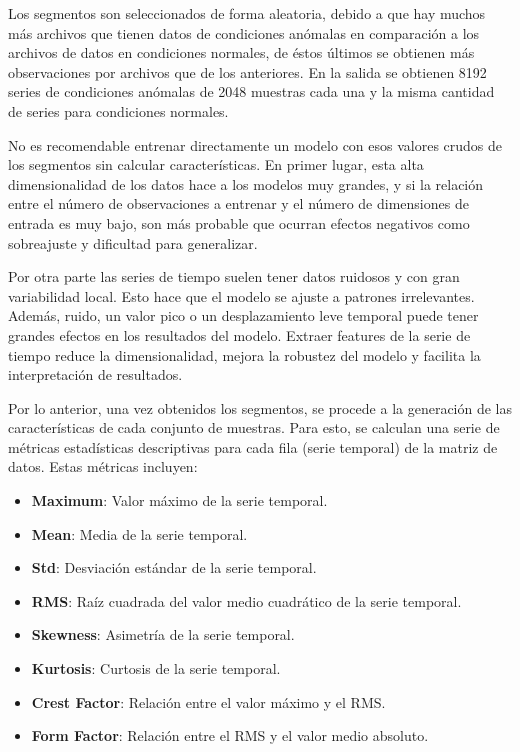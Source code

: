 \documentclass[11pt,a4paper,spanish]{book}
\numberwithin{equation}{chapter}
\numberwithin{figure}{chapter}
\begin{document}
Los segmentos son seleccionados de forma aleatoria, debido a que hay muchos más archivos que tienen datos de condiciones anómalas en comparación a los archivos de datos en condiciones normales, de éstos últimos se obtienen más observaciones por archivos que de los anteriores. En la salida se obtienen 8192 series de condiciones anómalas de 2048 muestras cada una y la misma cantidad de series para condiciones normales. 


No es recomendable entrenar directamente un modelo con esos valores crudos de los segmentos sin calcular características. En primer lugar, esta alta dimensionalidad de los datos hace a los modelos muy grandes, y si la relación entre el número de observaciones a entrenar y el número de dimensiones de entrada es muy bajo, son más probable que ocurran  efectos negativos como sobreajuste y dificultad para generalizar. 


Por otra parte las series de tiempo suelen tener datos ruidosos y con gran variabilidad local. Esto hace que el modelo se ajuste a patrones irrelevantes.  Además, ruido, un valor pico o un desplazamiento leve temporal puede tener grandes efectos en los resultados del modelo. Extraer features de la serie de tiempo reduce la dimensionalidad, mejora la robustez del modelo y facilita la interpretación de resultados. 


Por lo anterior, una vez obtenidos los segmentos, se procede a la generación de las características de cada conjunto de muestras. Para esto, se calculan una serie de métricas estadísticas descriptivas para cada fila (serie temporal) de la matriz de datos. Estas métricas incluyen:

\begin{itemize}
\item \textbf{Maximum}: Valor máximo de la serie temporal.
\item \textbf{Mean}: Media de la serie temporal.
\item \textbf{Std}: Desviación estándar de la serie temporal.
\item \textbf{RMS}: Raíz cuadrada del valor medio cuadrático de la serie temporal.
\item \textbf{Skewness}: Asimetría de la serie temporal.
\item \textbf{Kurtosis}: Curtosis de la serie temporal.
\item \textbf{Crest Factor}: Relación entre el valor máximo y el RMS.
\item \textbf{Form Factor}: Relación entre el RMS y el valor medio absoluto.
\end{itemize}
\end{document}
